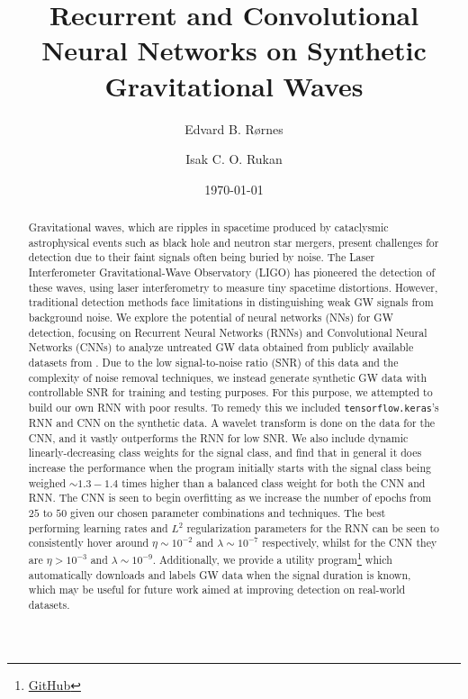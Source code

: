 \documentclass[%
reprint,
amsmath,amssymb,
aps,
]{revtex4-2}
\begin{document}
	
\title{Recurrent and Convolutional Neural Networks on Synthetic Gravitational Waves}
\author{Edvard B. Rørnes}
\author{Isak C. O. Rukan}
\date{\today}

\begin{abstract}
	Gravitational waves, which are ripples in spacetime produced by cataclysmic astrophysical events such as black hole and neutron star mergers, present challenges for detection due to their faint signals often being buried by noise. The Laser Interferometer Gravitational-Wave Observatory (LIGO) has pioneered the detection of these waves, using laser interferometry to measure tiny spacetime distortions. However, traditional detection methods face limitations in distinguishing weak GW signals from background noise. We explore the potential of neural networks (NNs) for GW detection, focusing on Recurrent Neural Networks (RNNs) and Convolutional Neural Networks (CNNs) to analyze untreated GW data obtained from publicly available datasets from \cite{gwosc}. Due to the low signal-to-noise ratio (SNR) of this data and the complexity of noise removal techniques, we instead generate synthetic GW data with controllable SNR for training and testing purposes. For this purpose, we attempted to build our own RNN with poor results. To remedy this we included \texttt{tensorflow.keras}'s \cite{tensorflow2015-whitepaper} RNN and CNN on the synthetic data. A wavelet transform is done on the data for the CNN, and it vastly outperforms the RNN for low SNR. We also include dynamic linearly-decreasing class weights for the signal class, and find that in general it does increase the performance when the program initially starts with the signal class being weighed $\sim1.3-1.4$ times higher than a balanced class weight for both the CNN and RNN. The CNN is seen to begin overfitting as we increase the number of epochs from $25$ to $50$ given our chosen parameter combinations and techniques. The best performing learning rates and $L^2$ regularization parameters for the RNN can be seen to consistently hover around $\eta\sim10^{-2}$ and $\lambda\sim10^{-7}$ respectively, whilst for the CNN they are $\eta>10^{-3}$ and $\lambda\sim10^{-9}$. Additionally, we provide a utility program\footnote{\href{https://github.com/EdvardRornes/FYS-STK4155/tree/main/Project3}{GitHub}} which automatically downloads and labels GW data when the signal duration is known, which may be useful for future work aimed at improving detection on real-world datasets.
\end{abstract}
\end{document}
